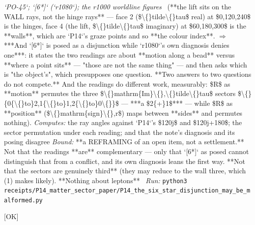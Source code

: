 \begin{description}
\textit{`PO-45`; `[6*]` (`r1080`); the r1000 worldline figures} \ (**the lift sits on the WALL rays, not the hinge rays** --- face 2 (\$\textbackslash\{\}tilde\textbackslash\{\}tau\$ real) at \$0,120,240\$ is the hinges, face 4 (the lift, \$\textbackslash\{\}tilde\textbackslash\{\}tau\$ imaginary) at \$60,180,300\$ is the **walls**, which are `P14`'s graze points and so **the colour index**. \ensuremath{\Rightarrow} ***And `[6*]` is posed as a disjunction while `r1080`'s own diagnosis denies one***: it states the two readings are about **motion along a bead** versus **where a point sits** --- "those are not the same thing" --- and then asks which is "the object's", which presupposes one question. **Two answers to two questions do not compete.**  And the readings do different work, measurably: \$R\$ as **motion** permutes the three \$\textbackslash\{\}mathrm\{Im\}\textbackslash\{\},\textbackslash\{\}tilde\textbackslash\{\}tau\$ sectors \$\textbackslash\{\}\{0\{\textbackslash\{\}to\}2,1\{\textbackslash\{\}to\}1,2\{\textbackslash\{\}to\}0\textbackslash\{\}\}\$ --- ***a \$2\{+\}1\$*** --- while \$R\$ as **position** (\$\textbackslash\{\}mathrm\{sign\}\textbackslash\{\},r\$) maps between **sides** and permutes nothing). 
\emph{Computes:} the ray angles against `P14`'s \$120j\$ and \$120j+180\$; the sector permutation under each reading; and that the note's diagnosis and its posing disagree
 \emph{Bound:}  **a REFRAMING of an open item, not a settlement.** Not that the readings **are** complementary --- only that `[6*]` as posed cannot distinguish that from a conflict, and its own diagnosis leans the first way. **Not that the sectors are genuinely third** (they may reduce to the wall three, which (1) makes likely). **Nothing about leptons**
\ \emph{Run:} \texttt{python3 receipts/P14\_matter\_sector\_paper/P14\_the\_six\_star\_disjunction\_may\_be\_malformed.py}
\item[\rcptlabel{P14_the_imaginary_time_three_is_genuinely_third}{P14R69}\textbf{P14R69}\quad\texttt{P14\_the\_imaginary\_time\_three\_is\_genuinely\_third}]\hfill\textsf{[OK]}\\

\end{description}
